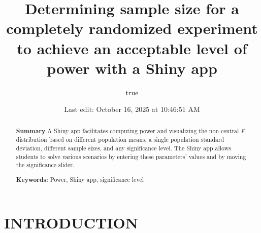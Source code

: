 \documentclass[
]{article}
\title{Determining sample size for a completely randomized experiment to achieve an acceptable level of power with a Shiny app}
\author{true}
\date{Last edit: October 16, 2025 at 10:46:51 AM}
\begin{document}
\maketitle
\begin{abstract}
\textbf{Summary} A Shiny app facilitates computing power and visualizing the non-central \emph{F} distribution based on different population means, a single population standard deviation, different sample sizes, and any significance level. The Shiny app allows students to solve various scenarios by entering these parameters' values and by moving the significance slider.

\textbf{Keywords:} Power, Shiny app, significance level
\end{abstract}

\section*{INTRODUCTION}\label{introduction}
\end{document}
